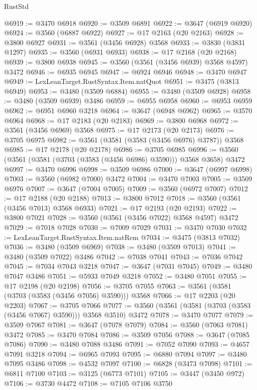 \begin{lexlean}{RustStd}
\begin{coremodule}
{\begin{coremodule}
{{{{{{{{{{{{{{{{{{{{{{{{{{{{{{{{{{{{{{{{{{{{{@6919 := @3470 @6918
@6920 := @3509 @6891
@6922 := @3647 (@6919 @6920)
@6924 := @3560 (@6887 @6922)
@6927 := @17 @2163 (@20 @2163)
@6928 := @3800 @6927
@6931 := @3561 (@3456 @6928) @3568
@6933 := @3830 (@3831 @1297)
@6935 := @3560 (@6931 @6933)
@6938 := @17 @2168 (@20 @2168)
@6939 := @3800 @6938
@6945 := @3560 (@3561 (@3456 @6939) @3568 @4597) @3472
@6946 := @6935 @6945
@6947 := @6924 @6946
@6948 := @3470 @6947
@6949 := LexLeanTarget.RustSyntax.Item.natQuot
@6951 := @3475 (@3813 @6949)
@6953 := @3480 (@3509 @6884)
@6955 := @3480 (@3509 @6928)
@6958 := @3480 (@3509 @6939) @3486
@6959 := @6955 @6958
@6960 := @6953 @6959
@6962 := @6951 @6960 @3218
@6964 := @3647 (@6948 @6962)
@6965 := @3570 @6964
@6968 := @17 @2183 (@20 @2183)
@6969 := @3800 @6968
@6972 := @3561 (@3456 @6969) @3568
@6975 := @17 @2173 (@20 @2173)
@6976 := @3705 @6975
@6982 := @3561 (@3581 (@3583 (@3456 @6976) @3787)) @3568
@6985 := @17 @2178 (@20 @2178)
@6986 := @3705 @6985
@6996 := @3560 (@3561 (@3581 (@3703 (@3583 (@3456 @6986) @3590))) @3568 @3658) @3472
@6997 := @3470 @6996
@6998 := @3509 @6986
@7000 := @3647 (@6997 @6998)
@7003 := @3560 (@6982 @7000) @3472
@7004 := @3470 @7003
@7005 := @3509 @6976
@7007 := @3647 (@7004 @7005)
@7009 := @3560 (@6972 @7007)
@7012 := @17 @2188 (@20 @2188)
@7013 := @3800 @7012
@7018 := @3560 (@3561 (@3456 @7013) @3568 @6933)
@7021 := @17 @2193 (@20 @2193)
@7022 := @3800 @7021
@7028 := @3560 (@3561 (@3456 @7022) @3568 @4597) @3472
@7029 := @7018 @7028
@7030 := @7009 @7029
@7031 := @3470 @7030
@7032 := LexLeanTarget.RustSyntax.Item.natRem
@7034 := @3475 (@3813 @7032)
@7036 := @3480 (@3509 @6969)
@7038 := @3480 (@3509 @7013)
@7041 := @3480 (@3509 @7022) @3486
@7042 := @7038 @7041
@7043 := @7036 @7042
@7045 := @7034 @7043 @3218
@7047 := @3647 (@7031 @7045)
@7049 := @3480 @7047 @3486
@7051 := @5933 @7049 @3218
@7052 := @3480 @7051
@7055 := @17 @2198 (@20 @2198)
@7056 := @3705 @7055
@7063 := @3561 (@3581 (@3703 (@3583 (@3456 @7056) @3590))) @3568
@7066 := @17 @2203 (@20 @2203)
@7067 := @3705 @7066
@7077 := @3560 (@3561 (@3581 (@3703 (@3583 (@3456 @7067) @3590))) @3568 @3510) @3472
@7078 := @3470 @7077
@7079 := @3509 @7067
@7081 := @3647 (@7078 @7079)
@7084 := @3560 (@7063 @7081) @3472
@7085 := @3470 @7084
@7086 := @3509 @7056
@7088 := @3647 (@7085 @7086)
@7090 := @3480 @7088 @3486
@7091 := @7052 @7090
@7093 := @4657 @7091 @3218
@7094 := @6965 @7093
@7095 := @6880 @7094
@7097 := @3480 @7095 @3486
@7098 := @4532 @7097
@7100 := @6828 (@3473 @7098)
@7101 := @6811 @7100
@7103 := @3125 (@6773 @7101)
@7105 := @3447 (@3450 @972)
@7106 := @3730 @4472
@7108 := @7105 @7106 @3750
}}}}}}}}}}}}}}}}}}}}}}}}}}}}}}}}}}}}}}}}}}}}}
\end{coremodule}}
\end{coremodule}
\end{lexlean}

